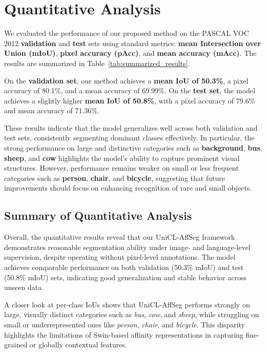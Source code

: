 \section{Quantitative Analysis}
\label{sec:quantitative_analysis}

We evaluated the performance of our proposed method on the PASCAL VOC 2012 \textbf{validation} and \textbf{test} sets using standard metrics: \textbf{mean Intersection over Union (mIoU)}, \textbf{pixel accuracy (pAcc)}, and \textbf{mean accuracy (mAcc)}. The results are summarized in Table~\ref{tab:summarized_results}. 

On the \textbf{validation set}, our method achieves a \textbf{mean IoU of 50.3\%}, a pixel accuracy of 80.1\%, and a mean accuracy of 69.99\%.  
On the \textbf{test set}, the model achieves a slightly higher \textbf{mean IoU of 50.8\%}, with a pixel accuracy of 79.6\% and mean accuracy of 71.36\%.  

These results indicate that the model generalizes well across both validation and test sets, consistently segmenting dominant classes effectively. In particular, the strong performance on large and distinctive categories such as \textbf{background}, \textbf{bus}, \textbf{sheep}, and \textbf{cow} highlights the model's ability to capture prominent visual structures. However, performance remains weaker on small or less frequent categories such as \textbf{person}, \textbf{chair}, and \textbf{bicycle}, suggesting that future improvements should focus on enhancing recognition of rare and small objects.






\subsection{Summary of Quantitative Analysis}
\label{subsubsec:quantitative_summary}

Overall, the quantitative results reveal that our UniCL-AffSeg framework demonstrates reasonable segmentation ability under image- and language-level supervision, despite operating without pixel-level annotations. The model achieves comparable performance on both validation (50.3\% mIoU) and test (50.8\% mIoU) sets, indicating good generalization and stable behavior across unseen data. 

A closer look at per-class IoUs shows that UniCL-AffSeg performs strongly on large, visually distinct categories such as \textit{bus}, \textit{cow}, and \textit{sheep}, while struggling on small or underrepresented ones like \textit{person}, \textit{chair}, and \textit{bicycle}. This disparity highlights the limitations of Swin-based affinity representations in capturing fine-grained or globally contextual features. 

